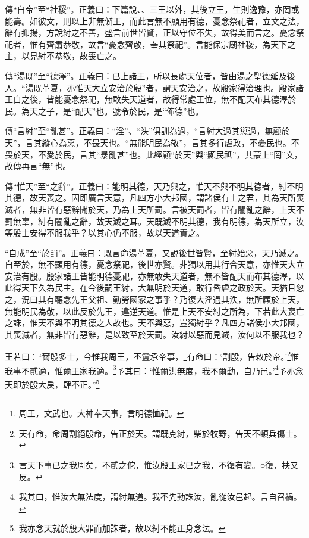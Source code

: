{\noindent\zhuan{}\fzbyks 傳“自帝”至“社稷”。正義曰：下篇說、、三王以外，其後立王，生則逸豫，亦罔或能壽。如彼文，則以上非無僻王，而此言無不顯用有德，憂念祭祀者，立文之法，辭有抑揚，方說紂之不善，盛言前世皆賢，正以守位不失，故得美而言之。憂念祭祀者，惟有齊肅恭敬，故言“憂念齊敬，奉其祭祀”。言能保宗廟社稷，為天下之主，以見紂不恭敬，故喪亡之。 \par}

{\noindent\zhuan{}\fzbyks 傳“湯既”至“德澤”。正義曰：已上諸王，所以長處天位者，皆由湯之聖德延及後人。“湯既革夏，亦惟天大立安治於殷”者，謂天安治之，故殷家得治理也。殷家諸王自之後，皆能憂念祭祀，無敢失天道者，故得常處王位，無不配天布其德澤於民。為天之子，是“配天”也。號令於民，是“佈德”也。 \par}

{\noindent\zhuan{}\fzbyks 傳“言紂”至“亂甚”。正義曰：“淫”、“泆”俱訓為過，“言紂大過其愆過，無顧於天”，言其縱心為惡，不畏天也。“無能明民為敬”，言其多行虐政，不憂民也。不畏於天，不愛於民，言其“暴亂甚”也。此經顧“於天”與“顯民祗”，共蒙上“罔”文，故傳再言“無”也。 \par}

{\noindent\zhuan{}\fzbyks 傳“惟天”至“之辭”。正義曰：能明其德，天乃與之，惟天不與不明其德者，紂不明其德，故天喪之。因即廣言天意，凡四方小大邦國，謂諸侯有土之君，其為天所喪滅者，無非皆有惡辭聞於天，乃為上天所罰。言被天罰者，皆有闇亂之辭，上天不罰無辜，紂有闇亂之辭，故天滅之耳。天既滅不明其德，我有明德，為天所立，汝等殷士安得不服我乎？以其心仍不服，故以天道責之。 \par}

{\noindent\shu{}\fzkt “自成”至“於罰”。正義曰：既言命湯革夏，又說後世皆賢，至紂始惡，天乃滅之。自至於，無不顯用有德，憂念祭祀，後世亦賢。非獨以用其行合天意，亦惟天大立安治有殷。殷家諸王皆能明德憂祀，亦無敢失天道者，無不皆配天而布其德澤，以此得天下久為民主。在今後嗣王紂，大無明於天道，敢行昏虐之政於天。天猶且忽之，況曰其有聽念先王父祖、勤勞國家之事乎？乃復大淫過其泆，無所顧於上天，無能明民為敬，以此反於先王，違逆天道。惟是上天不安紂之所為，下若此大喪亡之誅，惟天不與不明其德之人故也。天不與惡，豈獨紂乎？凡四方諸侯小大邦國，其喪滅者，無非皆有惡辭，是以致至於天罰。汝紂以惡而見滅，汝何以不服我也？ \par}

王若曰：“爾殷多士，今惟我周王，丕靈承帝事，\footnote{周王，文武也。大神奉天事，言明德恤祀。}有命曰：‘割殷，告敕於帝。’\footnote{天有命，命周割絕殷命，告正於天。謂既克紂，柴於牧野，告天不頓兵傷士。}惟我事不貳適，惟爾王家我適。\footnote{言天下事已之我周矣，不貳之佗，惟汝殷王家已之我，不復有變。○復，扶又反。}予其曰：‘惟爾洪無度，我不爾動，自乃邑。’\footnote{我其曰，惟汝大無法度，謂紂無道。我不先動誅汝，亂從汝邑起。言自召禍。}予亦念天即於殷大戾，肆不正。”\footnote{我亦念天就於殷大罪而加誅者，故以紂不能正身念法。}


